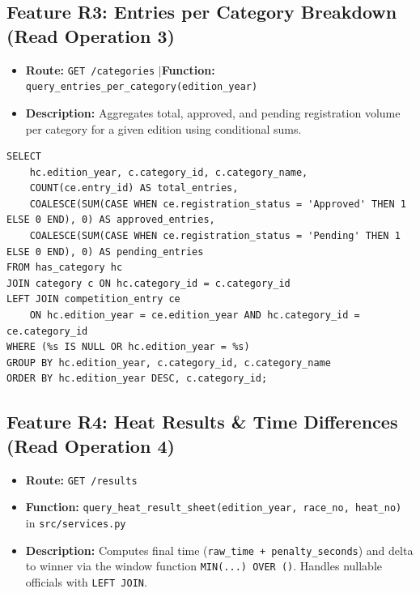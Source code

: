 \documentclass[11pt,a4paper]{article}
\begin{document}
\subsection{Feature R3: Entries per Category Breakdown (Read Operation 3)}
\begin{itemize}[leftmargin=1.5em, itemsep=0.5pt, topsep=0.5pt]
  \item \textbf{Route:} \texttt{GET /categories} \quad$\vert$\quad \textbf{Function:} \texttt{query\_entries\_per\_category(edition\_year)}
  \item \textbf{Description:} Aggregates total, approved, and pending registration volume per category for a given edition using conditional sums.
\end{itemize}

\begin{lstlisting}
SELECT 
    hc.edition_year, c.category_id, c.category_name,
    COUNT(ce.entry_id) AS total_entries,
    COALESCE(SUM(CASE WHEN ce.registration_status = 'Approved' THEN 1 ELSE 0 END), 0) AS approved_entries,
    COALESCE(SUM(CASE WHEN ce.registration_status = 'Pending' THEN 1 ELSE 0 END), 0) AS pending_entries
FROM has_category hc
JOIN category c ON hc.category_id = c.category_id
LEFT JOIN competition_entry ce 
    ON hc.edition_year = ce.edition_year AND hc.category_id = ce.category_id
WHERE (%s IS NULL OR hc.edition_year = %s)
GROUP BY hc.edition_year, c.category_id, c.category_name
ORDER BY hc.edition_year DESC, c.category_id;
\end{lstlisting}

\newpage

\subsection{Feature R4: Heat Results \& Time Differences (Read Operation 4)}
\begin{itemize}[leftmargin=1.5em, itemsep=0.5pt, topsep=0.5pt]
  \item \textbf{Route:} \texttt{GET /results}
  \item \textbf{Function:} \texttt{query\_heat\_result\_sheet(edition\_year, race\_no, heat\_no)} in \texttt{src/services.py}
  \item \textbf{Description:} Computes final time (\texttt{raw\_time + penalty\_seconds}) and delta to winner via the window function \texttt{MIN(...) OVER ()}. Handles nullable officials with \texttt{LEFT JOIN}.
\end{itemize}
\end{document}
